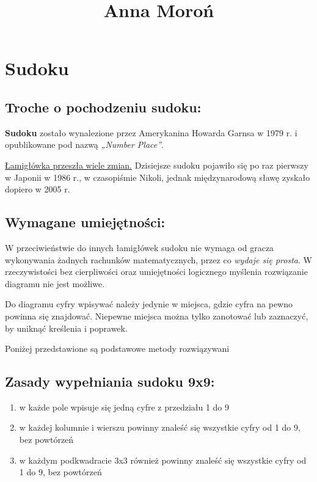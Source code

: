 \begin{center}
\begin{LARGE}
\title{\textbf{Anna Moroń}}
\end{LARGE}
\end{center}
\section{Sudoku}

\subsection{Troche o pochodzeniu sudoku:}
\begin{flushleft}
\textbf{Sudoku} zostało wynalezione przez Amerykanina Howarda Garnsa w 1979 r. i opublikowane pod nazwą \textit{„Number Place”}. \par

\underline{Łamigłówka przeszła wiele zmian.} Dzisiejsze sudoku pojawiło się po raz pierwszy w Japonii w 1986 r., w czasopiśmie Nikoli, jednak międzynarodową sławę zyskało dopiero w 2005 r.
\end{flushleft} 

\subsection{Wymagane umiejętności:}
\begin{center}
W przeciwieństwie do innych łamigłówek sudoku nie wymaga od gracza wykonywania żadnych rachunków matematycznych, przez co \emph{wydaje się prosta}. W rzeczywistości bez cierpliwości oraz umiejętności logicznego myślenia rozwiązanie diagramu nie jest możliwe.

Do diagramu cyfry wpisywać należy jedynie w miejsca, gdzie cyfra na pewno powinna się znajdować. Niepewne miejsca można tylko zanotować lub zaznaczyć, by uniknąć kreślenia i poprawek.

Poniżej przedstawione są podstawowe metody rozwiązywani
\end{center} 

\subsection{Zasady wypełniania sudoku 9x9:}
\begin{enumerate}
    \item w każde pole wpisuje się jedną cyfre z przedziału 1 do 9
    \item w każdej kolumnie i wierszu powinny znaleść się wszystkie cyfry od 1 do 9, bez powtórzeń
    \item w każdym podkwadracie 3x3 również powinny znaleść się wszystkie cyfry od 1 do 9, bez powtórzeń
    \end{enumerate} 

